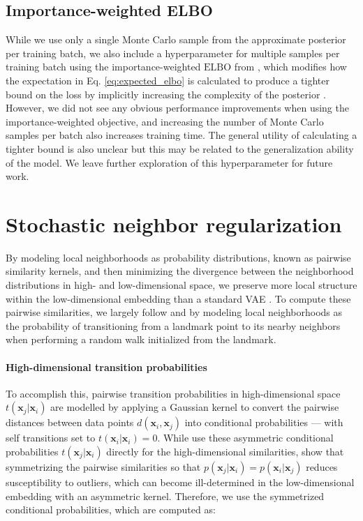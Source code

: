 \documentclass[11pt,a4paper,twoside]{book}
\begin{document}
\begin{doublespace}
\begin{appendices}
\subsection{Importance-weighted ELBO}
\label{appendix:iwae}
While we use only a single Monte Carlo sample from the approximate posterior per training batch, we also include a hyperparameter for multiple samples per training batch using the importance-weighted $\mathrm{ELBO}$ from \cite{burda2015iwae}, which modifies how the expectation in Eq. \ref{eq:expected_elbo} is calculated to produce a tighter bound on the loss by implicitly increasing the complexity of the posterior \citep{cremer2017reinterpreting}. However, we did not see any obvious performance improvements when using the importance-weighted objective, and increasing the number of Monte Carlo samples per batch also increases training time. The general utility of calculating a tighter bound is also unclear \citep{rainforth2018tighter} but this may be related to the generalization ability of the model. We leave further exploration of this hyperparameter for future work.

\section{Stochastic neighbor regularization}
\label{appendix:sne}
By modeling local neighborhoods as probability distributions, known as pairwise similarity kernels, and then minimizing the divergence between the neighborhood distributions in high- and low-dimensional space, we preserve more local structure within the low-dimensional embedding than a standard VAE \citep{ding2018scvis}. To compute these pairwise similarities, we largely follow \cite{hinton2003stochastic} and \cite{maaten2008tsne} by modeling local neighborhoods as the probability of transitioning from a landmark point to its nearby neighbors when performing a random walk initialized from the landmark. 

\paragraph{High-dimensional transition probabilities} To accomplish this, pairwise transition probabilities in high-dimensional space $t(\mathbf{x}_j | \mathbf{x}_i)$ are modelled by applying a Gaussian kernel to convert the pairwise distances between data points $d(\mathbf{x}_i, \mathbf{x}_j)$ into conditional probabilities --- with self transitions set to $t(\mathbf{x}_i | \mathbf{x}_i) = 0$. While \cite{ding2018scvis} use these asymmetric conditional probabilities $t(\mathbf{x}_j | \mathbf{x}_i)$ directly for the high-dimensional similarities, \cite{maaten2008tsne} show that symmetrizing the pairwise similarities so that $p(\mathbf{x}_j | \mathbf{x}_i) = p(\mathbf{x}_i | \mathbf{x}_j)$ reduces susceptibility to outliers, which can become ill-determined in the low-dimensional embedding with an asymmetric kernel. Therefore, we use the symmetrized conditional probabilities, which are computed as:


\end{appendices}
\end{doublespace}
\end{document}
